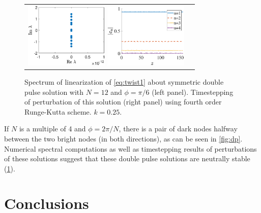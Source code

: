 \documentclass[reprint, amsmath,amssymb,aps,pra]{revtex4-2}
\begin{document}
\begin{figure}
\begin{center}
\begin{tabular}{cc}
\includegraphics[width=4cm]{dp12pi6spec.eps}
\includegraphics[width=4cm]{dp12pi6pert.eps}
\end{tabular}
\end{center}
\caption{Spectrum of linearization of \cref{eq:twist1} about symmetric double pulse solution with $N=12$ and $\phi = \pi/6$ (left panel). Timestepping of perturbation of this solution (right panel) using fourth order Runge-Kutta scheme. $k=0.25$.}
\label{fig:dpstab}
\end{figure}

If $N$ is a multiple of 4 and $\phi = 2\pi/N$, there is a pair of dark nodes halfway between the two bright nodes (in both directions), as can be seen in \cref{fig:dp}. Numerical spectral computations as well as timestepping results of perturbations of these solutions suggest that these double pulse solutions are neutrally stable (\cref{fig:dpstab}).

\section{Conclusions}
\end{document}
